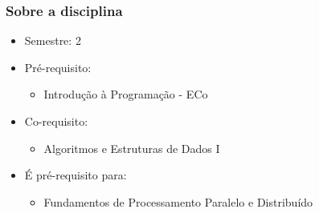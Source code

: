 \documentclass[aspectratio=169]{beamer}
\begin{document}
\begin{frame}\frametitle{Sobre a disciplina}
\begin{itemize}
	\item Semestre: 2
	\item Pré-requisito:
		\begin{itemize}
			\item Introdução à Programação - ECo
		\end{itemize}
	\item Co-requisito:
		\begin{itemize}
			\item Algoritmos e Estruturas de Dados I
		\end{itemize}
	\item É pré-requisito para:
		\begin{itemize}
			\item Fundamentos de Processamento Paralelo e Distribuído
		\end{itemize}
\end{itemize}
\end{frame}

{%
\begin{frame}\frametitle{}
\end{frame}
}
\end{document}
